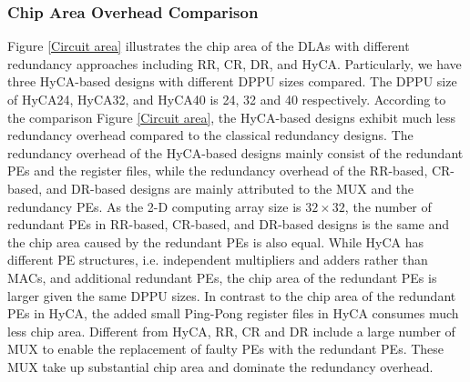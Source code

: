 \subsubsection{Chip Area Overhead Comparison} \label{sec:chip-area}
Figure \ref{Circuit area} illustrates the chip area of the DLAs with different redundancy approaches including RR, CR, DR, and HyCA. Particularly, we have three HyCA-based designs with different DPPU sizes compared. The DPPU size of HyCA24, HyCA32, and HyCA40 is 24, 32 and 40 respectively. According to the comparison Figure \ref{Circuit area}, the HyCA-based designs exhibit much less redundancy overhead compared to the classical redundancy designs. The redundancy overhead of the HyCA-based designs mainly consist of the redundant PEs and the register files, while the redundancy overhead of the RR-based, CR-based, and DR-based designs are mainly attributed to the MUX and the redundancy PEs. As the 2-D computing array size is $32 \times 32$, the number of redundant PEs in RR-based, CR-based, and DR-based designs is the same and the chip area caused by the redundant PEs is also equal. While HyCA has different PE structures, i.e. independent multipliers and adders rather than MACs, and additional redundant PEs, the chip area of the redundant PEs is larger given the same DPPU sizes. In contrast to the chip area of the redundant PEs in HyCA, the added small Ping-Pong register files in HyCA consumes much less chip area. Different from HyCA, RR, CR and DR include a large number of MUX to enable the replacement of faulty PEs with the redundant PEs. These MUX take up substantial chip area and dominate the redundancy overhead. 

